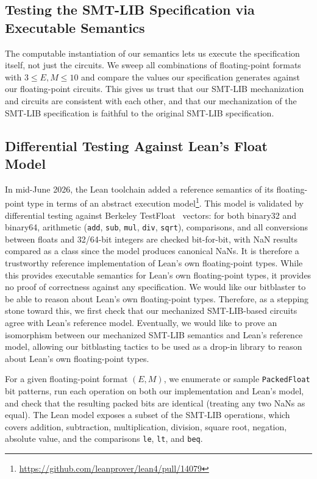 \subsection{Testing the SMT-LIB Specification via Executable Semantics}

The computable instantiation of our semantics lets us execute the specification itself, not just the circuits.
We sweep all combinations of floating-point formats with
$3 \leq E, M \leq 10$ and compare the values our specification generates
against our floating-point circuits. This gives us trust that our SMT-LIB mechanization and circuits
are consistent with each other, and that our mechanization of the SMT-LIB specification is faithful to the original SMT-LIB specification.

\subsection{Differential Testing Against Lean's Float Model}

In mid-June 2026, the Lean toolchain added a reference semantics of its
floating-point type in terms of an abstract execution model\footnote{\url{https://github.com/leanprover/lean4/pull/14079}}.
This model is validated by differential testing against Berkeley TestFloat~\cite{testfloat,softfloat} vectors:
for both binary32 and binary64, arithmetic (\texttt{add}, \texttt{sub}, \texttt{mul}, \texttt{div}, \texttt{sqrt}),
comparisons, and all conversions between floats and 32/64-bit integers are checked bit-for-bit,
with NaN results compared as a class since the model produces canonical NaNs.
It is therefore a trustworthy reference implementation of Lean's own floating-point types.
While this provides executable semantics for Lean's own floating-point types,
it provides no proof of correctness against any specification.
We would like our bitblaster to be able to reason about Lean's own floating-point types. Therefore, as a stepping stone toward this,
we first check that our mechanized SMT-LIB-based circuits agree with Lean's reference model.
Eventually, we would like to prove an isomorphism between our mechanized SMT-LIB semantics and Lean's reference model,
allowing our bitblasting tactics to be used as a drop-in library to reason about Lean's own floating-point types.

For a given floating-point format $(E, M)$, we enumerate or sample \texttt{PackedFloat} bit patterns,
run each operation on both our implementation and Lean's model, and check that the
resulting packed bits are identical (treating any two NaNs as equal).
The Lean model exposes a subset of the SMT-LIB operations,
which covers addition, subtraction, multiplication, division, square root,
negation, absolute value, and the comparisons \texttt{le}, \texttt{lt}, and \texttt{beq}.

